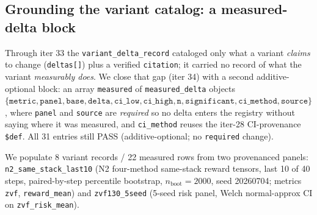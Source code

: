 \documentclass{article}
\begin{document}
\subsection{Grounding the variant catalog: a measured-delta block}
\label{sec:p6-measured-delta-block}

Through iter 33 the \texttt{variant\_delta\_record} cataloged only what a
variant \emph{claims} to change (\texttt{deltas[]}) plus a verified
\texttt{citation}; it carried no record of what the variant
\emph{measurably does}. We close that gap (iter 34) with a second
additive-optional block: an array \texttt{measured} of
\texttt{measured\_delta} objects
$\{\texttt{metric},\texttt{panel},\texttt{base},\texttt{delta},
\texttt{ci\_low},\texttt{ci\_high},\texttt{n},\texttt{significant},
\texttt{ci\_method},\texttt{source}\}$, where \texttt{panel} and
\texttt{source} are \emph{required} so no delta enters the registry
without saying where it was measured, and \texttt{ci\_method} reuses the
iter-28 CI-provenance \texttt{\$def}. All 31 entries still PASS
(additive-optional; no \texttt{required} change).

We populate 8 variant records / 22 measured rows from two provenanced
panels: \texttt{n2\_same\_stack\_last10} (N2 four-method same-stack
reward tensors, last 10 of 40 steps, paired-by-step percentile bootstrap,
$n_{\text{boot}}{=}2000$, seed 20260704; metrics \texttt{zvf},
\texttt{reward\_mean}) and \texttt{zvf130\_5seed} (5-seed risk panel,
Welch normal-approx CI on \texttt{zvf\_risk\_mean}).
\end{document}

